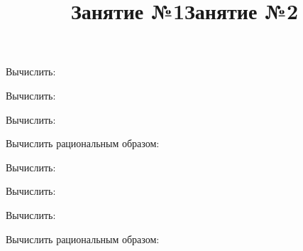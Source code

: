 \title{Занятие №1}
\begin{listofex}
	\item Вычислить:
	\begin{enumcols}[itemcolumns=2]
		\item {}
		\item {}
	\end{enumcols}
	\item Вычислить:
	\begin{enumcols}[itemcolumns=2]
		\item {}
		\item {}
	\end{enumcols}
	\item Вычислить:
	\begin{enumcols}[itemcolumns=1]
		\item {}
		\item {}
		\item {}
	\end{enumcols}
	\item Вычислить рациональным образом:
	\begin{enumcols}[itemcolumns=2]
		\item {}
		\item {}
	\end{enumcols}
	\item {}
\end{listofex}
\newpage
\title{Занятие №2}
\begin{listofex}
	\item Вычислить:
	\begin{enumcols}[itemcolumns=2]
		\item {}
		\item {}
	\end{enumcols}
	\item Вычислить:
	\begin{enumcols}[itemcolumns=2]
		\item {}
		\item {}
	\end{enumcols}
	\item Вычислить:
	\begin{enumcols}[itemcolumns=1]
		\item {}
		\item {}
		\item {}
	\end{enumcols}
	\item Вычислить рациональным образом:
	\begin{enumcols}[itemcolumns=2]
		\item {}
		\item {}
	\end{enumcols}
	\item {}
\end{listofex}
